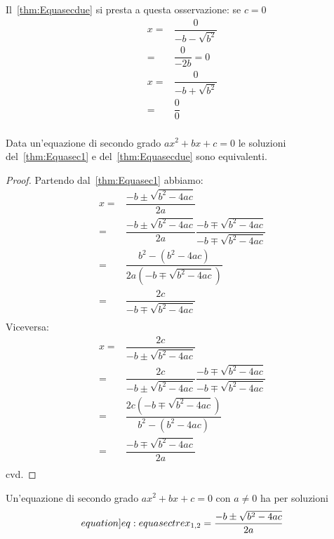 \begin{commento}
	Il~\vref{thm:Equasecdue} si presta a questa osservazione: se $c=0$
	\begin{align*}
		x=&\dfrac{0}{-b-\sqrt{b^2}}\\
		=&\dfrac{0}{-2b}=0\\
		x=&\dfrac{0}{-b+\sqrt{b^2}}\\
		=&\dfrac{0}{0}\\
	\end{align*}
\end{commento}
\begin{thm}[Equivalenza]
	Data un'equazione di secondo grado $ax^2+bx+c=0$ le soluzioni 
	del~\vref{thm:Equasec1} e del~\vref{thm:Equasecdue} sono equivalenti.
\end{thm}
\begin{proof}
	Partendo dal~\vref{thm:Equasec1} abbiamo:
	\begin{align*}
	 x=&\dfrac{-b\pm\sqrt{b^2-4ac}}{2a}\\
	=&\dfrac{-b\pm\sqrt{b^2-4ac}}{2a}\dfrac{-b\mp\sqrt{b^2-4ac}}{-b\mp\sqrt{b^2-4ac}}\\
	=&\dfrac{b^2-(b^2-4ac)}{2a(-b\mp\sqrt{b^2-4ac})}\\
	=&\dfrac{2c}{-b\mp\sqrt{b^2-4ac}}\\
	\end{align*}
Viceversa:
\begin{align*}
	x=&\dfrac{2c}{-b\pm\sqrt{b^2-4ac}}\\
	=&\dfrac{2c}{-b\pm\sqrt{b^2-4ac}}\dfrac{-b\mp\sqrt{b^2-4ac}}{-b\mp\sqrt{b^2-4ac}}\\
	=&\dfrac{2c(-b\mp\sqrt{b^2-4ac})}{b^2-(b^2-4ac)}\\
	=&\dfrac{-b\mp\sqrt{b^2-4ac}}{2a}\\
\end{align*}
cvd.
\end{proof}
\begin{thm}[Simmetria]\label{thm:Equasectre}
	Un'equazione di secondo grado $ax^2+bx+c=0$ con $a\neq 0$ ha per soluzioni 
	\begin{equation*}\label[equation]{eq:equasectre}
		x_{1,2}=\dfrac{-b\pm\sqrt{b^2-4ac}}{2a}
	\end{equation*}	
\end{thm}\cite{Mueller2021}
